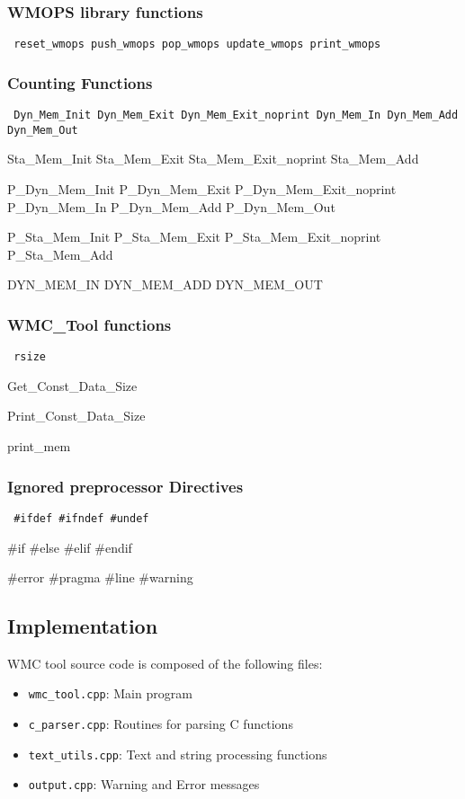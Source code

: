 \subsubsection{WMOPS library functions}
{\tt
    reset\_wmops push\_wmops pop\_wmops update\_wmops print\_wmops
}

\subsubsection{Counting Functions}
{\tt
    Dyn\_Mem\_Init Dyn\_Mem\_Exit Dyn\_Mem\_Exit\_noprint Dyn\_Mem\_In Dyn\_Mem\_Add Dyn\_Mem\_Out

    Sta\_Mem\_Init Sta\_Mem\_Exit Sta\_Mem\_Exit\_noprint Sta\_Mem\_Add

    P\_Dyn\_Mem\_Init P\_Dyn\_Mem\_Exit P\_Dyn\_Mem\_Exit\_noprint P\_Dyn\_Mem\_In P\_Dyn\_Mem\_Add P\_Dyn\_Mem\_Out

    P\_Sta\_Mem\_Init P\_Sta\_Mem\_Exit P\_Sta\_Mem\_Exit\_noprint P\_Sta\_Mem\_Add

    DYN\_MEM\_IN DYN\_MEM\_ADD DYN\_MEM\_OUT
}

\subsubsection{WMC\_Tool functions}
{\tt
    rsize

    Get\_Const\_Data\_Size

    Print\_Const\_Data\_Size

    print\_mem
}

\subsubsection{Ignored preprocessor Directives}
{\tt
    \#ifdef \#ifndef \#undef

    \#if \#else \#elif \#endif

    \#error \#pragma \#line \#warning
}

\subsection{Implementation}

WMC tool source code is composed of the following files:

\begin{itemize}
    \item {\tt wmc\_tool.cpp}: Main program
    \item {\tt c\_parser.cpp}: Routines for parsing C functions
    \item {\tt text\_utils.cpp}: Text and string processing functions
    \item {\tt output.cpp}: Warning and Error messages
\end{itemize}

